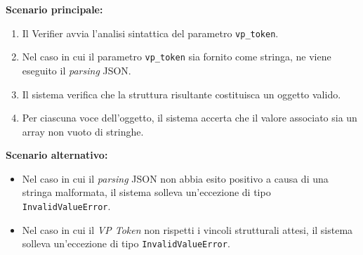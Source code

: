 \noindent\textbf{Scenario principale:}
\begin{enumerate}
    \item Il Verifier avvia l'analisi sintattica del parametro \texttt{vp\_\allowbreak{}token}.
    \item Nel caso in cui il parametro \texttt{vp\_\allowbreak{}token} sia fornito come stringa, ne viene eseguito il \textit{parsing} JSON.
    \item Il sistema verifica che la struttura risultante costituisca un oggetto valido.
    \item Per ciascuna voce dell'oggetto, il sistema accerta che il valore associato sia un array non vuoto di stringhe.
\end{enumerate}

\noindent\textbf{Scenario alternativo:}
\begin{itemize}
    \item Nel caso in cui il \textit{parsing} JSON non abbia esito positivo a causa di una stringa malformata, il sistema solleva un'eccezione di tipo \texttt{InvalidValueError}.
    \item Nel caso in cui il \textit{VP Token} non rispetti i vincoli strutturali attesi, il sistema solleva un'eccezione di tipo \texttt{InvalidValueError}.
\end{itemize}


